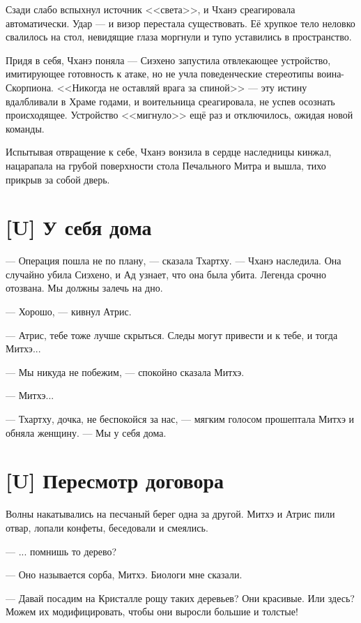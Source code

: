 Сзади слабо вспыхнул источник <<света>>, и Чханэ среагировала автоматически.
Удар --- и визор перестала существовать.
Её хрупкое тело неловко свалилось на стол, невидящие глаза моргнули и тупо уставились в пространство.

Придя в себя, Чханэ поняла --- Сиэхено запустила отвлекающее устройство, имитирующее готовность к атаке, но не учла поведенческие стереотипы воина-Скорпиона.
<<Никогда не оставляй врага за спиной>> --- эту истину вдалбливали в Храме годами, и воительница среагировала, не успев осознать происходящее.
Устройство <<мигнуло>> ещё раз и отключилось, ожидая новой команды.

Испытывая отвращение к себе, Чханэ вонзила в сердце наследницы кинжал, нацарапала на грубой поверхности стола Печального Митра и вышла, тихо прикрыв за собой дверь.

\section{[U] У себя дома}

\textspace

--- Операция пошла не по плану, --- сказала Тхартху.
--- Чханэ наследила.
Она случайно убила Сиэхено, и Ад узнает, что она была убита.
Легенда срочно отозвана.
Мы должны залечь на дно.

--- Хорошо, --- кивнул Атрис.

--- Атрис, тебе тоже лучше скрыться.
Следы могут привести и к тебе, и тогда Митхэ...

--- Мы никуда не побежим, --- спокойно сказала Митхэ.

--- Митхэ...

--- Тхартху, дочка, не беспокойся за нас, --- мягким голосом прошептала Митхэ и обняла женщину.
--- Мы у себя дома.

\section{[U] Пересмотр договора}

Волны накатывались на песчаный берег одна за другой.
Митхэ и Атрис пили отвар, лопали конфеты, беседовали и смеялись.

--- ... помнишь то дерево?

--- Оно называется сорба, Митхэ.
Биологи мне сказали.

--- Давай посадим на Кристалле рощу таких деревьев?
Они красивые.
Или здесь?
Можем их модифицировать, чтобы они выросли большие и толстые!

